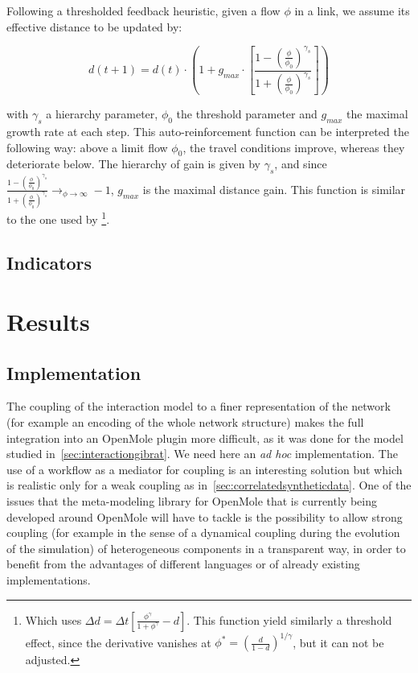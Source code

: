 Following a thresholded feedback heuristic, given a flow $\phi$ in a link, we assume its effective distance to be updated by:

\begin{equation}
d(t+1) = d(t)\cdot \left( 1 + g_{max} \cdot \left[\frac{1 - \left(\frac{\phi}{\phi_0}\right)^{\gamma_s}}{1 + \left(\frac{\phi}{\phi_0}\right)^{\gamma_s}}\right]\right)
\end{equation}

with $\gamma_s$ a hierarchy parameter, $\phi_0$ the threshold parameter and $g_{max}$ the maximal growth rate at each step. This auto-reinforcement function can be interpreted the following way: above a limit flow $\phi_0$, the travel conditions improve, whereas they deteriorate below. The hierarchy of gain is given by $\gamma_s$, and since $\frac{1 - \left(\frac{\phi}{\phi_0}\right)^{\gamma_s}}{1 + \left(\frac{\phi}{\phi_0}\right)^{\gamma_s}} \rightarrow_{\phi\rightarrow \infty} -1$, $g_{max}$ is the maximal distance gain. This function is similar to the one used by \cite{tero2007mathematical}\footnote{Which uses $\Delta d = \Delta t \left[ \frac{\phi^\gamma}{1 + \phi^\gamma} - d\right]$. This function yield similarly a threshold effect, since the derivative vanishes at $\phi^{\ast} = \left(\frac{d}{1 - d}\right)^{1/\gamma}$, but it can not be adjusted.}.



\subsection{Indicators}



%


\section{Results}


\subsection{Implementation}

The coupling of the interaction model to a finer representation of the network (for example an encoding of the whole network structure) makes the full integration into an OpenMole plugin more difficult, as it was done for the model studied in~\ref{sec:interactiongibrat}. We need here an \emph{ad hoc} implementation. The use of a workflow as a mediator for coupling is an interesting solution but which is realistic only for a weak coupling as in~\ref{sec:correlatedsyntheticdata}. One of the issues that the meta-modeling library for OpenMole that is currently being developed around OpenMole will have to tackle is the possibility to allow strong coupling (for example in the sense of a dynamical coupling during the evolution of the simulation) of heterogeneous components in a transparent way, in order to benefit from the advantages of different languages or of already existing implementations. 

